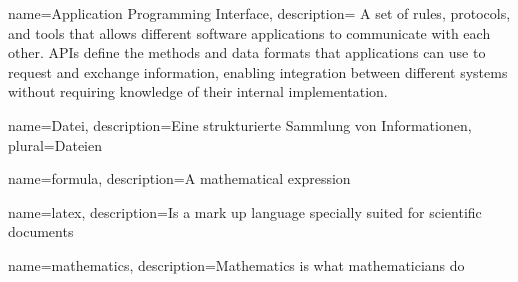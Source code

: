 
{
        name={Application Programming Interface},
        description={
                A set of rules, protocols, and tools that allows different software applications to communicate with each other.
                APIs define the methods and data formats that applications can use to request and exchange information, enabling integration between different systems without requiring knowledge of their internal implementation.
        }
}


{
        name={Datei},
        description={Eine strukturierte Sammlung von Informationen},
        plural={Dateien}
}


{
        name=formula,
        description={A mathematical expression}
}


{
        name=latex,
        description={Is a mark up language specially suited for scientific documents}
}


{
        name=mathematics,
        description={Mathematics is what mathematicians do}
}
